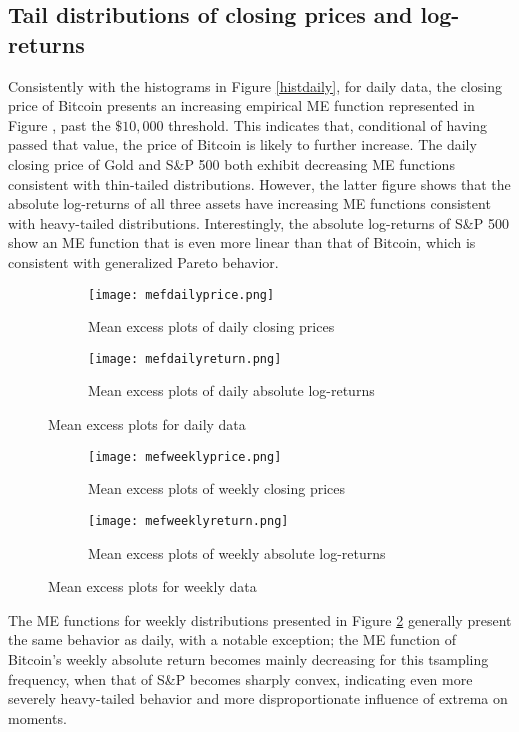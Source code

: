 \documentclass[12pt]{article}
\begin{document}
\subsection{Tail distributions of closing prices and log-returns}
\label{mef}
Consistently with the histograms in Figure \ref{histdaily}, for daily data, the closing price of Bitcoin presents an increasing empirical ME function represented in Figure \label{mefdaily}, past the $\$10,000$ threshold. This indicates that, conditional of having passed that value, the price of Bitcoin is likely to further increase. The daily closing price of Gold and S\&P 500 both exhibit decreasing ME functions consistent with thin-tailed distributions. However, the latter figure shows that the absolute log-returns of all three assets have increasing ME functions consistent with heavy-tailed distributions. Interestingly, the absolute log-returns of S\&P 500 show an ME function that is even more linear than that of Bitcoin, which is consistent with generalized Pareto behavior.

\begin{figure}[H]
\centering
\begin{subfigure}[b]{\textwidth}
\texttt{[image: mefdailyprice.png]}\hfill
\caption{Mean excess plots of daily closing prices}
\end{subfigure}
\begin{subfigure}[b]{\textwidth}
\texttt{[image: mefdailyreturn.png]}\hfill
\caption{Mean excess plots of daily absolute log-returns}
\end{subfigure}
\caption{Mean excess plots for daily data}
\label{mefdaily}
\end{figure}
\begin{figure}[H]
\centering
\begin{subfigure}[b]{\textwidth}
\texttt{[image: mefweeklyprice.png]}\hfill
\caption{Mean excess plots of weekly closing prices}
\end{subfigure}
\begin{subfigure}[b]{\textwidth}
\texttt{[image: mefweeklyreturn.png]}\hfill
\caption{Mean excess plots of weekly absolute log-returns}
\end{subfigure}
\caption{Mean excess plots for weekly data}
\label{mefweekly}
\end{figure}
The ME functions for weekly distributions presented in Figure \ref{mefweekly} generally present the same behavior as daily, with a notable exception; the ME function of Bitcoin's weekly absolute return becomes mainly decreasing for this tsampling frequency, when that of S\&P becomes sharply convex, indicating even more severely heavy-tailed behavior and more disproportionate influence of extrema on moments. 
\end{document}
